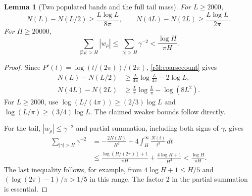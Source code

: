 \documentclass[11pt,a4paper]{article}
\newtheorem{lemma}[theorem]{Lemma}
\theoremstyle{definition}\newtheorem{definition}[theorem]{Definition}
\theoremstyle{remark}\newtheorem{remark}[theorem]{Remark}
\numberwithin{equation}{section}
\begin{document}
\begin{lemma}[Two populated bands and the full tail mass]
\label{r5l:bands}
For $L\ge2000$,
\begin{equation}\label{r5l:bandcounts}
 N(L)-N(L/2)\ge\frac{L\log L}{8\pi},
 \qquad
 N(4L)-N(2L)\ge\frac{L\log L}{2\pi}.
\end{equation}
For $H\ge20000$,
\begin{equation}\label{r5l:tailmass}
 \sum_{|\Im\rho|>H}|w_\rho|
 \le\sum_{|\gamma|>H}\gamma^{-2}
 <\frac{\log H}{\pi H}.
\end{equation}
\end{lemma}
\begin{proof}
Since $P'(t)=\log(t/(2\pi))/(2\pi)$,
\eqref{r5l:coarsecount} gives
\begin{align*}
 N(L)-N(L/2)&\ge
       \frac{L}{4\pi}\log\frac{L}{4\pi}-2\log L,\\
 N(4L)-N(2L)&\ge
       \frac{L}{\pi}\log\frac{L}{\pi}-\log(8L^2).
\end{align*}
For $L\ge2000$, use
$\log(L/(4\pi))\ge(2/3)\log L$ and
$\log(L/\pi)\ge(3/4)\log L$.  The claimed weaker bounds
follow directly.

For the tail, $|w_\rho|\le\gamma^{-2}$ and partial summation,
including both signs of $\gamma$, gives
\begin{align*}
 \sum_{|\gamma|>H}\gamma^{-2}
 &=-\frac{2N(H)}{H^2}+4\int_H^\infty\frac{N(t)}{t^3}\,dt\\
 &\le\frac{\log(H/(2\pi))+1}{\pi H}
             +\frac{4\log H+1}{H^2}
 <\frac{\log H}{\pi H}.
\end{align*}
The last inequality follows, for example, from
$4\log H+1\le H/5$ and $(\log(2\pi)-1)/\pi>1/5$ in this range.
The factor $2$ in the partial summation is essential.
\end{proof}
\end{document}
